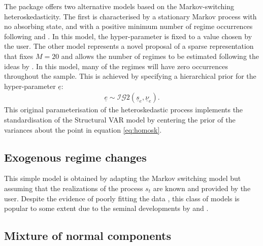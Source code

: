 \documentclass[
  nojss]{jss}
\begin{document}
The package  offers two alternative models based on the
Markov-switching heteroskedasticity. The first is characterised by a
stationary Markov process with no absorbing state, and with a positive
minimum number of regime occurrences following \cite{LLM2010} and
\cite{Wozniak2015}. In this model, the hyper-parameter is fixed to a
value chosen by the user. The other model represents a novel proposal of
a sparse representation that fixes \(M=20\) and allows the number of
regimes to be estimated following the ideas by \cite{malsiner2016model}.
In this model, many of the regimes will have zero occurrences throughout
the sample. This is achieved by specifying a hierarchical prior for the
hyper-parameter \(\underline{e}\): \begin{align}
\underline{e} \sim \mathcal{IG}2\left(\underline{s}_e, \underline{\nu}_e\right). \label{eq:sparseprior}
\end{align} This original parameterisation of the heteroskedastic
process implements the standardisation of the Structural VAR model by
centering the prior of the variances about the point in equation
\eqref{eq:homosk}.

\subsection{Exogenous regime changes}

This simple model is obtained by adapting the Markov switching model but
assuming that the realizations of the process \(s_t\) are known and
provided by the user. Despite the evidence of poorly fitting the data
\citep[see e.g.][]{Wozniak2015}, this class of models is popular to some
extent due to the seminal developments by \cite{Rigobon03} and
\cite{Lanne2008}.

\subsection{Mixture of normal components}
\end{document}
